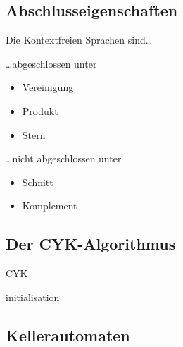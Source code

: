\documentclass{scrartcl}
\begin{document}
\subsection*{Abschlusseigenschaften}
\begin{shaded}
Die Kontextfreien Sprachen sind\dots \\
\begin{minipage}[t]{0.48\textwidth}
\dots abgeschlossen unter
\begin{itemize}
    \item Vereinigung
    \item Produkt
    \item Stern
\end{itemize}
\end{minipage}
\hfill \vrule \hfill
\begin{minipage}[t]{0.48\textwidth}
\dots nicht abgeschlossen unter
\begin{itemize}
    \item Schnitt
    \item Komplement
\end{itemize}
\end{minipage}
\end{shaded}

\subsection*{Der CYK-Algorithmus}
\begin{algorithm}[H]
    \caption{CYK}
    \SetAlgoLined
    \LinesNumbered
    \PrintSemicolon
    initialisation\;
\end{algorithm}

\subsection*{Kellerautomaten}
\end{document}
